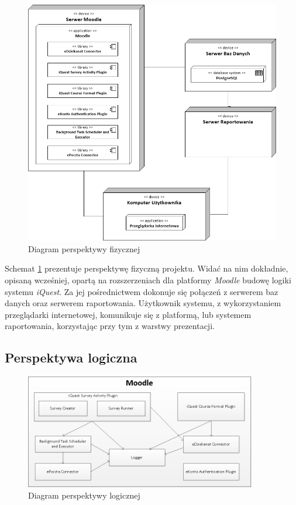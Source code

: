 \begin{figure}[H]
\centering\includegraphics[width=15cm]{figures/PhysicalView}
\caption{Diagram perspektywy fizycznej}\label{rys:PerspektywaFizyczna}
\end{figure}

Schemat \ref{rys:PerspektywaFizyczna} prezentuje perspektywę fizyczną projektu. Widać na nim dokładnie, opisaną wcześniej, opartą na rozszerzeniach dla platformy \textit{Moodle} budowę logiki systemu \textit{iQuest}. Za jej pośrednictwem dokonuje się połączeń z serwerem baz danych oraz serwerem raportowania. Użytkownik systemu, z wykorzystaniem przeglądarki internetowej, komunikuje się z platformą, lub systemem raportowania, korzystając przy tym z warstwy prezentacji.

\subsection{Perspektywa logiczna}
\label{Chapter542}

\begin{figure}[H]
\centering\includegraphics[width=0.9\textwidth]{figures/LogicalView}
\caption{Diagram perspektywy logicznej}\label{rys:PerspektywaLogiczna}
\end{figure}

